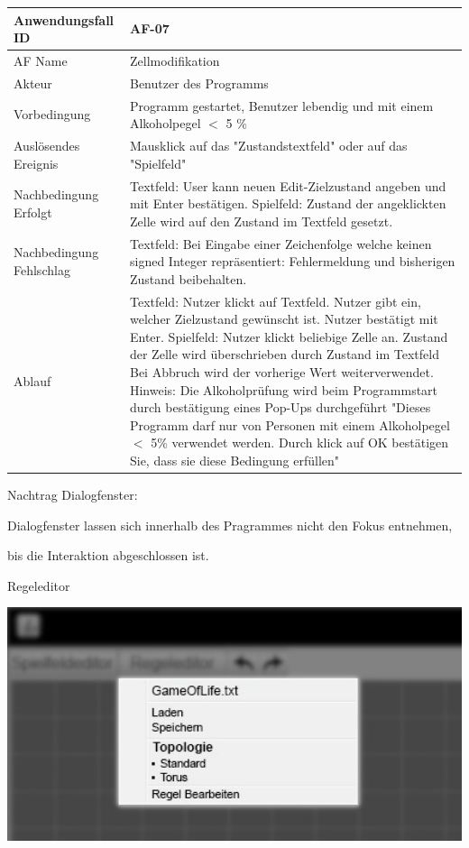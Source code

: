 \documentclass[11pt,a4paper]{article}
\begin{document}
\begin{tabular}[m]{|m{7cm}|m{9cm}|}
    \hline
    Anwendungsfall ID     & AF-07 \\
         \hline
    AF Name     & Zellmodifikation \\
         \hline
    Akteur&Benutzer des Programms \\
    \hline
    Vorbedingung&Programm gestartet, Benutzer lebendig und mit einem Alkoholpegel $<$ 5 \% \\
    \hline
    Auslösendes Ereignis&Mausklick auf das "Zustandstextfeld" oder auf das "Spielfeld"\\
    \hline
    Nachbedingung Erfolgt& Textfeld: User kann neuen Edit-Zielzustand angeben und mit Enter bestätigen. Spielfeld: Zustand der angeklickten Zelle wird auf den Zustand im Textfeld gesetzt. \\
    \hline
    Nachbedingung Fehlschlag&Textfeld: Bei Eingabe einer Zeichenfolge welche keinen signed Integer repräsentiert: Fehlermeldung und bisherigen Zustand beibehalten.\\
    \hline
    Ablauf&Textfeld: Nutzer klickt auf Textfeld. Nutzer gibt ein, welcher Zielzustand gewünscht ist. Nutzer bestätigt mit Enter. 
    \linebreak
    Spielfeld: Nutzer klickt beliebige Zelle an. Zustand der Zelle wird überschrieben durch Zustand im Textfeld
    Bei Abbruch wird der vorherige Wert weiterverwendet.
    \linebreak 
    Hinweis: Die Alkoholprüfung wird beim Programmstart durch bestätigung eines Pop-Ups durchgeführt "Dieses Programm darf nur von Personen mit einem Alkoholpegel $<$ 5\% verwendet werden. Durch klick auf OK bestätigen Sie, dass sie diese Bedingung erfüllen"\\
    \hline
    
\end{tabular}
\par
\medskip 
Nachtrag Dialogfenster: 
\par
Dialogfenster lassen sich innerhalb des Pragrammes nicht den Fokus entnehmen, \par bis die Interaktion abgeschlossen ist.
\pagebreak

    Regeleditor %

\par
\includegraphics[width=15cm]{regeleditor_dropdown_edit} %
\end{document}
